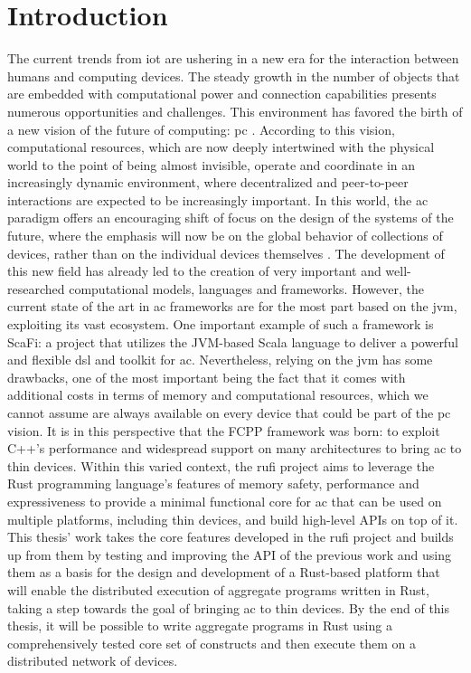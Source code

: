 
\chapter{Introduction}
\label{chap:introduction}
The current trends from \ac{iot} are ushering in a new era for the interaction between humans and computing devices. The steady growth in the number of objects that are embedded with computational power
and connection capabilities presents numerous opportunities and challenges. This environment has favored the birth of a new vision of the future of computing: \ac{pc} \cite{satyanarayanan2001pervasive}.
According to this vision, computational resources, which are now deeply intertwined with the physical world to the point of being almost invisible, operate and coordinate in an increasingly
dynamic environment, where decentralized and peer-to-peer interactions are expected to be increasingly important. In this world, the \ac{ac} paradigm offers an encouraging shift of focus on the design
of the systems of the future, where the emphasis will now be on the global behavior of collections of devices, rather than on the individual devices themselves \cite{7274429}.
The development of this new field has already led to the creation of very important and well-researched computational models, languages and frameworks. However, the current state of the art in \ac{ac}
frameworks are for the most part based on the \ac{jvm}, exploiting its vast ecosystem. One important example of such a framework is ScaFi: a project that utilizes the JVM-based Scala language
to deliver a powerful and flexible \ac{dsl} and toolkit for \ac{ac}. Nevertheless, relying on the \ac{jvm} has some drawbacks, one of the most important being the fact that it comes with additional costs in terms
of memory and computational resources, which we cannot assume are always available on every device that could be part of the \ac{pc} vision. It is in this perspective that the FCPP framework was born:
to exploit C++'s performance and widespread support on many architectures to bring \ac{ac} to thin devices. Within this varied context, the \ac{rufi} project aims to leverage the Rust programming language's 
features of memory safety, performance and expressiveness to provide a minimal functional core for \ac{ac} that can be used on multiple platforms, including thin devices, and build high-level APIs on top of it.
This thesis' work takes the core features developed in the \ac{rufi} project and builds up from them by testing and improving the API of the previous work and using them as a basis for the design and development of a Rust-based platform that will enable the distributed execution of aggregate programs written in Rust,
taking a step towards the goal of bringing \ac{ac} to thin devices.
By the end of this thesis, it will be possible to write aggregate programs in Rust using a comprehensively tested core set of constructs and then execute them on a distributed network of devices.

